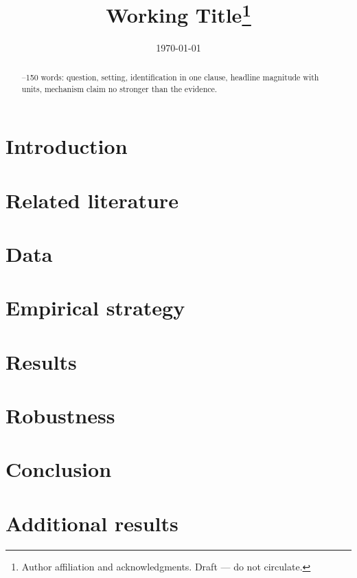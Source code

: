 \documentclass[12pt]{article}
\title{Working Title\thanks{Author affiliation and acknowledgments. Draft — do not circulate.}}
\author{}
\date{\today}
\begin{document}
\maketitle

\begin{abstract}
--150 words: question, setting, identification in one clause, headline magnitude with units, mechanism claim no stronger than the evidence.
\end{abstract}

\section{Introduction}

\section{Related literature}

\section{Data}

\section{Empirical strategy}

\section{Results}
% 

\section{Robustness}

\section{Conclusion}



\appendix
\section{Additional results}
\end{document}

